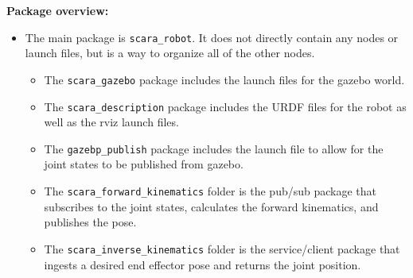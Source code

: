 \documentclass[10pt]{article}
\begin{document}
\setlength{\abovedisplayskip}{6pt}
\setlength{\belowdisplayskip}{3pt}
\setlength{\abovedisplayshortskip}{4pt}
\setlength{\belowdisplayshortskip}{4pt}

\textbf{Package overview:}
\begin{itemize}
	\item The main package is \texttt{scara\_robot}. It does not directly contain any nodes or launch files, but is a way to organize all of the other nodes.
	\begin{itemize}
		\item The \texttt{scara\_gazebo} package includes the launch files for the gazebo world.
		\item The \texttt{scara\_description} package includes the URDF files for the robot as well as the rviz launch files.
		\item The \texttt{gazebp\_publish} package includes the launch file to allow for the joint states to be published from gazebo.
		\item The \texttt{scara\_forward\_kinematics} folder is the pub/sub package that subscribes to the joint states, calculates the forward kinematics, and publishes the pose.
		\item The \texttt{scara\_inverse\_kinematics} folder is the service/client package that ingests a desired end effector pose and returns the joint position.
	\end{itemize}
\end{itemize}
\end{document}
